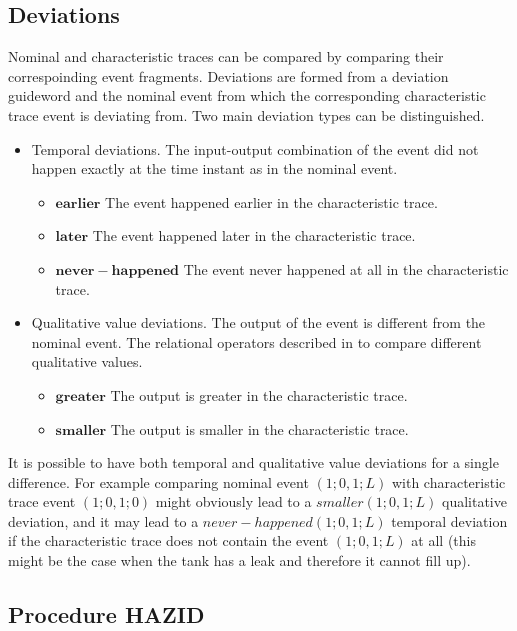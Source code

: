 \documentclass[conference]{IEEEtran}
\begin{document}
\subsection{Deviations}
\label{sec:deviations}
Nominal and characteristic traces can be compared by comparing their correspoinding event fragments. Deviations are formed from a deviation guideword and the nominal event from which the corresponding characteristic trace event is deviating from. Two main deviation types can be distinguished.

\begin{itemize}
\item Temporal deviations. The input-output combination of the event did not happen exactly at the time instant as in the nominal event. 
	\begin{itemize}
	  \item $\mathbf{earlier}$ The event happened earlier in the characteristic trace.
	  \item $\mathbf{later}$ The event happened later in the characteristic trace.
	  \item $\mathbf{never-happened}$ The event never happened at all in the characteristic trace.
	\end{itemize}
\item Qualitative value deviations. The output of the event is different from the nominal event. The relational operators described in \cite{KES2010} to compare different qualitative values.
	\begin{itemize}
	  \item $\mathbf{greater}$ The output is greater in the characteristic trace.
	  \item $\mathbf{smaller}$ The output is smaller in the characteristic trace.
	\end{itemize}
\end{itemize}

It is possible to have both temporal and qualitative value deviations for a single difference. For example comparing nominal event $(1;0,1;L)$ with characteristic trace event $(1;0,1;0)$ might obviously lead to a $smaller(1;0,1;L)$ qualitative deviation, and it may lead to a $never-happened(1;0,1;L)$ temporal deviation if the characteristic trace does not contain the event $(1;0,1;L)$ at all (this might be the case when the tank has a leak and therefore it cannot fill up).

\subsection{Procedure HAZID}
\label{sec:prochazid}
\end{document}
